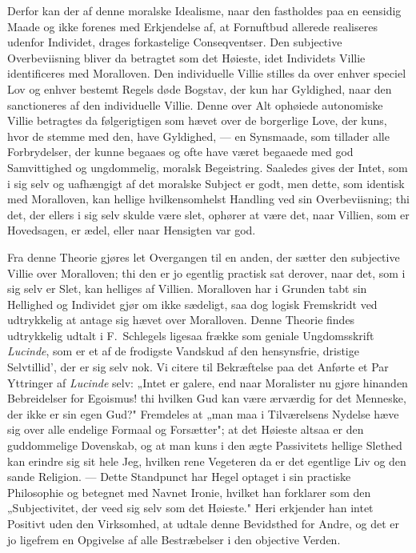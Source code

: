 \documentclass[12pt]{article}
\newcommand{\opage}[1]{\marginnote{\footnotesize\textit{[#1]}}}
\begin{document}
Derfor kan der af denne moralske Idealisme, naar den fastholdes paa en eensidig Maade og ikke forenes med Erkjendelse af, at Fornuftbud allerede realiseres udenfor Individet, drages forkastelige Conseqventser. Den subjective Overbeviisning bliver da betragtet som det Høieste, idet Individets Villie identificeres med Moralloven. Den individuelle Villie stilles da over enhver speciel Lov og enhver bestemt Regels døde Bogstav, der kun har Gyldighed, naar den sanctioneres af den individuelle Villie. Denne over Alt ophøiede autonomiske Villie betragtes da følgerigtigen som hævet over de borgerlige Love, der kuns, hvor de stemme med den, have Gyldighed, --- en Synsmaade, som tillader alle Forbrydelser, der kunne begaaes og ofte have været be\opage{155}gaaede med god Samvittighed og ungdommelig, moralsk Begeistring. Saaledes gives der Intet, som i sig selv og uafhængigt af det moralske Subject er godt, men dette, som identisk med Moralloven, kan hellige hvilkensomhelst Handling ved sin Overbeviisning; thi det, der ellers i sig selv skulde være slet, ophører at være det, naar Villien, som er Hovedsagen, er ædel, eller naar Hensigten var god.

Fra denne Theorie gjøres let Overgangen til en anden, der sætter den subjective Villie over Moralloven; thi den er jo egentlig practisk sat derover, naar det, som i sig selv er Slet, kan helliges af Villien. Moralloven har i Grunden tabt sin Hellighed og Individet gjør om ikke sædeligt, saa dog logisk Fremskridt ved udtrykkelig at antage sig hævet over Moralloven. Denne Theorie findes udtrykkelig udtalt i F.\ Schlegels ligesaa frække som geniale Ungdomsskrift \emph{Lucinde}, som er et af de frodigste Vandskud af den hensynsfrie, dristige Selvtillid', der er sig selv nok. Vi citere til Bekræftelse paa det Anførte et Par Yttringer af \emph{Lucinde} selv: „Intet er galere, end naar Moralister nu gjøre hinanden Bebreidelser for Egoismus! thi hvilken Gud kan være ærværdig for det Menneske, der ikke er sin egen Gud?" Fremdeles at „man maa i Tilværelsens Nydelse hæve sig over alle endelige Formaal og Forsætter"; at det Høieste altsaa er den guddommelige Dovenskab, og at man kuns i den ægte Passivitets hellige Slethed kan erindre sig sit hele Jeg, hvilken rene Vegeteren da er det egentlige Liv og den sande Religion. --- Dette Standpunct har Hegel optaget i sin practiske Philosophie og betegnet med Navnet Ironie, hvilket han forklarer som den „Subjectivitet, der veed sig selv som det Høieste." Heri erkjender han intet Positivt uden den Virksomhed, at udtale denne Bevidsthed for Andre, og det er jo ligefrem en Opgivelse af alle Bestræbelser i den objective Verden.
\end{document}
